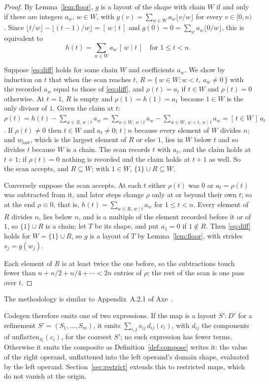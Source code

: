 \begin{proof}
By Lemma~\ref{lem:floor}, $g$ is a layout of the shape with chain $W$ if
and only if there are integers $a_w$, $w \in W$, with
$g(v) = \sum_{w \in W} a_w \lfloor v/w \rfloor$ for every $v \in [0,n)$.
Since $\lfloor t/w \rfloor - \lfloor (t-1)/w \rfloor = [\,w \mid t\,]$ and
$g(0) = 0 = \sum_{w} a_w \lfloor 0/w \rfloor$, this is equivalent to
\begin{equation}\label{eq:diff}
h(t) = \sum_{w \in W} a_w\, [\,w \mid t\,] \quad\text{for } 1 \le t < n.
\end{equation}

Suppose \eqref{eq:diff} holds for some chain $W$ and coefficients $a_w$. We
show by induction on $t$ that when the scan reaches $t$,
$R = \{\, w \in W : w < t,\ a_w \ne 0 \,\}$ with the recorded $a_w$ equal
to those of \eqref{eq:diff}, and $\rho(t) = a_t$ if $t \in W$ and
$\rho(t) = 0$ otherwise. At $t = 1$, $R$ is empty and $\rho(1) = h(1) =
a_1$ because $1 \in W$ is the only divisor of $1$. Given the claim at $t$:
$\rho(t) = h(t) - \sum_{w \in R,\, w \mid t} a_w = \sum_{w \in W,\, w \mid t}
a_w - \sum_{w \in W,\, w < t,\, w \mid t} a_w = [\,t \in W\,]\, a_t$. If
$\rho(t) \ne 0$ then $t \in W$ and $a_t \ne 0$; $t \mid n$ because every
element of $W$ divides $n$; and $w_{\mathrm{last}}$, which is the largest
element of $R$ or else $1$, lies in $W$ below $t$ and so divides $t$
because $W$ is a chain. The scan records $t$ with $a_t$, and the claim
holds at $t+1$; if $\rho(t) = 0$ nothing is recorded and the claim holds at
$t+1$ as well. So the scan accepts, and $R \subseteq W$; with $1 \in W$,
$\{1\} \cup R \subseteq W$.

Conversely suppose the scan accepts. At each $t$ either $\rho(t)$ was $0$
or $a_t = \rho(t)$ was subtracted from it, and later steps change $\rho$
only at or beyond their own $t$; so at the end $\rho \equiv 0$, that is,
$h(t) = \sum_{w \in R,\, w \mid t} a_w$ for $1 \le t < n$. Every element of
$R$ divides $n$, lies below $n$, and is a multiple of the element recorded
before it or of $1$, so $\{1\} \cup R$ is a chain; let $T$ be its shape,
and put $a_1 = 0$ if $1 \notin R$. Then \eqref{eq:diff} holds for
$W = \{1\} \cup R$, so $g$ is a layout of $T$ by Lemma~\ref{lem:floor}, with
strides $s_j = g(w_j)$.

Each element of $R$ is at least twice the one before, so the subtractions
touch fewer than $n + n/2 + n/4 + \cdots < 2n$ entries of $\rho$; the rest
of the scan is one pass over $t$.
\end{proof}

The methodology is similar to Appendix~A.2.1 of Axe~\cite{axe}.

Codegen therefore emits one of two expressions. If the map is a layout
$S'{:}D'$ for a refinement $S' = (S_1,\dots,S_m)$, it emits
$\sum_{i,j} s_{ij}\, d_{ij}(c_i)$, with $d_{ij}$ the components of
$\mathrm{unflatten}_{S_i}(c_i)$, for the coarsest $S'$; no such expression has
fewer terms. Otherwise it emits the composite as Definition~\ref{def:compose}
writes it: the value of the right operand, unflattened into the left operand's
domain shape, evaluated by the left operand. Section~\ref{sec:restrict}
extends this to restricted maps, which do not vanish at the origin.
